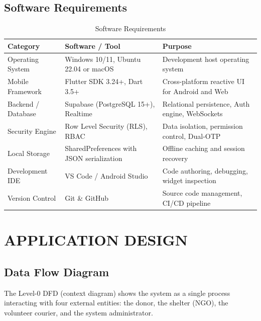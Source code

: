 \documentclass[12pt,a4paper]{article}
\begin{document}
\subsection{Software Requirements}
\begin{table}[H]
\centering
\caption{Software Requirements}
\label{tab:software_req}
\begin{tabularx}{\textwidth}{|l|l|X|}
    \hline
    \textbf{Category} & \textbf{Software / Tool} & \textbf{Purpose} \\
    \hline
    Operating System & Windows 10/11, Ubuntu 22.04 or macOS & Development host operating system \\
    \hline
    Mobile Framework & Flutter SDK 3.24+, Dart 3.5+ & Cross-platform reactive UI for Android and Web \\
    \hline
    Backend / Database & Supabase (PostgreSQL 15+), Realtime & Relational persistence, Auth engine, WebSockets \\
    \hline
    Security Engine & Row Level Security (RLS), RBAC & Data isolation, permission control, Dual-OTP \\
    \hline
    Local Storage & SharedPreferences with JSON serialization & Offline caching and session recovery \\
    \hline
    Development IDE & VS Code / Android Studio & Code authoring, debugging, widget inspection \\
    \hline
    Version Control & Git \& GitHub & Source code management, CI/CD pipeline \\
    \hline
\end{tabularx}
\end{table}

\newpage
\section{APPLICATION DESIGN}

\subsection{Data Flow Diagram}
The Level-0 DFD (context diagram) shows the system as a single process interacting with four external entities: the donor, the shelter (NGO), the volunteer courier, and the system administrator.
\end{document}

